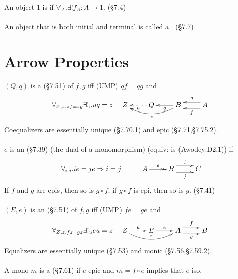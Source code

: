 \documentclass[10pt,twocolumn,letterpaper]{article}
\begin{document}
  \paragraph{}
  An object $1$ is  if $\forall_A . \exists! f_A : A \to 1$.
  (\S7.4)

  \paragraph{}
  An object that is both initial and terminal is called a .
  (\S7.7)

\section{Arrow Properties} %

  \paragraph{}
  $(Q,q)$ is a  (\S7.51) of $f,g$ iff (UMP) $qf = qg$ and
     \[\forall_{Z,z . zf = zg} \exists!_u uq = z \quad
     \xymatrix{
     Z & Q \ar@{..>}[l]^u & B \ar[l]^q \ar@/^1pc/[ll]^{z} & A \ar@<1ex>[l]^f \ar@<-1ex>[l]_g
     }\]
  Coequalizers are essentially unique (\S7.70.1) and epic (\S7.71,\S7.75.2).

  \paragraph{}
  $e$ is an  (\S7.39) (the dual of a monomorphism)
  (equiv: is  (Awodey:D2.1)) if
    \[\xymatrix{\forall_{i,j} . ie = je \Rightarrow i = j & A \ar@{->>}[r]^e & B \ar@<1ex>[r]^{i} \ar@<-1ex>[r]_j & C} \]
  If $f$ and $g$ are epis, then so is $g \circ f$; if $g \circ f$ is epi,
  then so is $g$. (\S7.41)

  \paragraph{}
  $(E,e)$ is an  (\S7.51) of $f,g$ iff (UMP) $fe = ge$ and
     \[\forall_{Z,z . fz = gz} \exists!_u eu = z \quad
     \xymatrix{
     Z \ar@{..>}[r]^u \ar@/_1pc/[rr]^{z} & E \ar[r]^e & A \ar@<1ex>[r]^f \ar@<-1ex>[r]_g & B \\
     }\]
  Equalizers are essentially unique (\S7.53) and monic (\S7.56,\S7.59.2).

  \paragraph{}
  A mono $m$ is a  (\S7.61) if $e$ epic and
  $m = f \circ e$ implies that $e$ iso.
\end{document}

